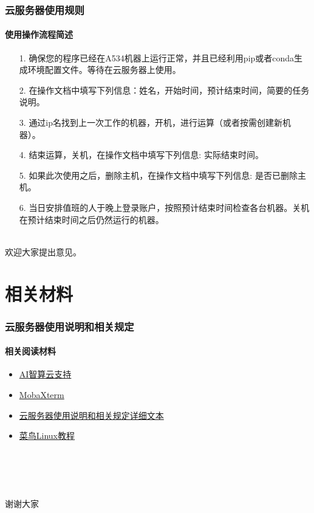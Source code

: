 \documentclass[10pt]{beamer}
\begin{document}
        \begin{frame}
            \frametitle{云服务器使用规则}
                \framesubtitle{使用操作流程简述}
                    \begin{itemize}
                        \item [1. ]{确保您的程序已经在A534机器上运行正常，并且已经利用pip或者conda生成环境配置文件。等待在云服务器上使用。}
                        \item [2. ]{在操作文档中填写下列信息：姓名，开始时间，预计结束时间，简要的任务说明。}
                        \item [3. ]{通过ip名找到上一次工作的机器，开机，进行运算（或者按需创建新机器）。}
                        \item [4. ]{结束运算，关机，在操作文档中填写下列信息: 实际结束时间。}
                        \item [5. ]{如果此次使用之后，删除主机，在操作文档中填写下列信息: 是否已删除主机。}
                        \item [6. ]{当日安排值班的人于晚上登录账户，按照预计结束时间检查各台机器。关机在预计结束时间之后仍然运行的机器。}
                    \end{itemize}
                    \hspace*{\fill}\\
                    \centering
                    {\large 欢迎大家提出意见。}

        \end{frame}

    \section{相关材料}
        \begin{frame}
            \frametitle{云服务器使用说明和相关规定}
                \framesubtitle{相关阅读材料}
                \begin{itemize}
                    \item \href{https://ai.blsc.cn/\#/support/info}{AI智算云支持} \\
                    \item \href{https://mobaxterm.mobatek.net}{MobaXterm} \\
                    \item \href{https://github.com/Ls-Dai/Cloud-Sever-Tutorial}{云服务器使用说明和相关规定详细文本} \\
                    \item \href{https://www.runoob.com/linux/linux-tutorial.html}{菜鸟Linux教程} \\
                \end{itemize}
                \hspace*{\fill} \\
                \hspace*{\fill} \\
                \hspace*{\fill} \\
                \hspace*{\fill} \\
                \centering
                {\huge 谢谢大家}
        \end{frame}
\end{document}
